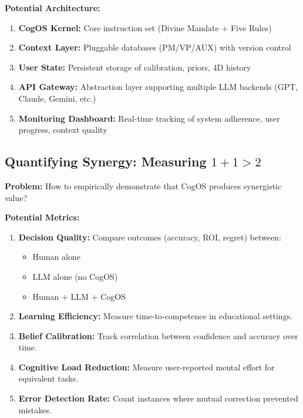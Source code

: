 \documentclass[11pt,a4paper]{article}
\theoremstyle{definition}
\theoremstyle{remark}
\begin{document}
\textbf{Potential Architecture:}
\begin{enumerate}
    \item \textbf{CogOS Kernel:} Core instruction set (Divine Mandate + Five Rules)
    \item \textbf{Context Layer:} Pluggable databases (PM/VP/AUX) with version control
    \item \textbf{User State:} Persistent storage of calibration, priors, 4D history
    \item \textbf{API Gateway:} Abstraction layer supporting multiple LLM backends (GPT, Claude, Gemini, etc.)
    \item \textbf{Monitoring Dashboard:} Real-time tracking of system adherence, user progress, context quality
\end{enumerate}

\subsection{Quantifying Synergy: Measuring $1+1>2$}

\textbf{Problem:} How to empirically demonstrate that CogOS produces synergistic value?

\textbf{Potential Metrics:}
\begin{enumerate}
    \item \textbf{Decision Quality:} Compare outcomes (accuracy, ROI, regret) between:
    \begin{itemize}
        \item Human alone
        \item LLM alone (no CogOS)
        \item Human + LLM + CogOS
    \end{itemize}
    
    \item \textbf{Learning Efficiency:} Measure time-to-competence in educational settings.
    
    \item \textbf{Belief Calibration:} Track correlation between confidence and accuracy over time.
    
    \item \textbf{Cognitive Load Reduction:} Measure user-reported mental effort for equivalent tasks.
    
    \item \textbf{Error Detection Rate:} Count instances where mutual correction prevented mistakes.
\end{enumerate}
\end{document}
